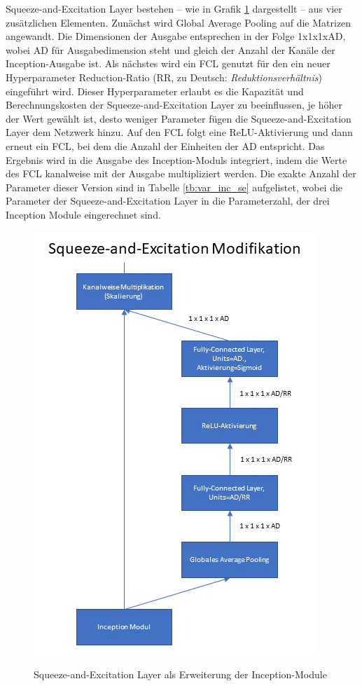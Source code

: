 Squeeze-and-Excitation Layer bestehen -- wie in Grafik \ref{fig:sae} dargestellt -- aus vier zusätzlichen Elementen. Zunächst wird Global Average Pooling auf die Matrizen angewandt. Die Dimensionen der Ausgabe entsprechen in der Folge 1x1x1xAD, wobei AD für Ausgabedimension steht und gleich der Anzahl der Kanäle der Inception-Ausgabe ist. Als nächstes wird ein FCL genutzt für den ein neuer Hyperparameter Reduction-Ratio (RR, zu Deutsch: \textit{Reduktionsverhältnis}) eingeführt wird. Dieser Hyperparameter erlaubt es die Kapazität und Berechnungskosten der Squeeze-and-Excitation Layer zu beeinflussen, je höher der Wert gewählt ist, desto weniger Parameter fügen die Squeeze-and-Excitation Layer dem Netzwerk hinzu. Auf den FCL folgt eine ReLU-Aktivierung und dann erneut ein FCL, bei dem die Anzahl der Einheiten der AD entspricht. Das Ergebnis wird in die Ausgabe des Inception-Moduls integriert, indem die Werte des FCL kanalweise mit der Ausgabe multipliziert werden.  Die exakte Anzahl der Parameter dieser Version sind in Tabelle \ref{tb:var_inc_se} aufgelistet, wobei die Parameter der Squeeze-and-Excitation Layer in die Parameterzahl, der drei Inception Module eingerechnet sind.

\begin{figure}[H]
\centering
\caption[Caption for LOF]{Squeeze-and-Excitation Layer als Erweiterung der Inception-Module}
\includegraphics[scale=0.9]{pictures/Inception/SqueezeAndExcitation}
\label{fig:sae}
\end{figure}

